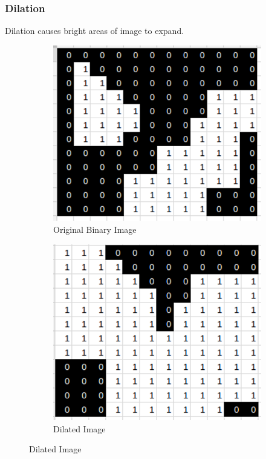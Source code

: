 \documentclass[11pt]{report}
\begin{document}
\subsubsection*{Dilation}
\begin{center}
	Dilation causes bright areas of image to expand.
\end{center}
\begin{figure}
	\centering
	\begin{subfigure}{.45\textwidth}
		\centering
		\includegraphics[scale=0.45]{pics/morphologyexample.png}
		\caption{Original Binary Image}
	\end{subfigure}
	\hfill
	\begin{subfigure}{.45\textwidth}
		\centering
		\includegraphics[scale=0.45]{pics/morphologyexample_d.png}
		\caption{Dilated Image}
	\end{subfigure}
	\label{fig:DilationExample}
\end{figure}
\end{document}

